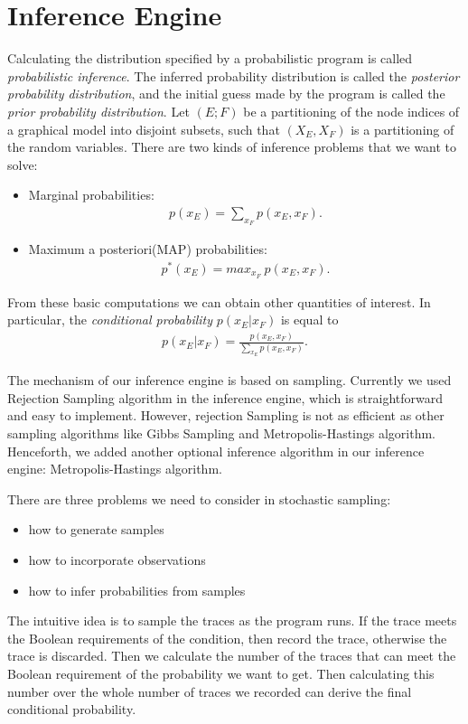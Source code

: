 \section{Inference Engine}
\label{sec:infer}
Calculating the distribution specified by a probabilistic program is called \textit{probabilistic inference}. The inferred probability distribution is called the \textit{posterior probability distribution}, and the initial guess made by the program is called the \textit{prior probability distribution}. Let $(E; F)$ be a partitioning of the node indices of a graphical model into disjoint subsets, such that $(X_E, X_F)$ is a partitioning of the random variables. There are two kinds of inference problems that we want to solve:
\begin{itemize}
  \item Marginal probabilities:
  \begin{align*}
    p(x_E) = \sum_{x_F} p(x_E, x_F).
  \end{align*}
  \item Maximum a posteriori(MAP) probabilities:
  \begin{align*}
    p^*(x_E) = max_{x_F} ~p(x_E, x_F).
  \end{align*}
\end{itemize}
From these basic computations we can obtain other quantities of interest. In particular, the \textit{conditional probability} $p(x_E | x_F)$ is equal to
\begin{align*}
  p(x_E | x_F) = \frac{p(x_E, x_F)}{\sum_{x_E} p(x_E, x_F)}.
\end{align*}

The mechanism of our inference engine is based on sampling. Currently we used Rejection Sampling algorithm in the inference engine, which is straightforward and easy to implement. However, rejection Sampling is not as efficient as other sampling algorithms like Gibbs Sampling and Metropolis-Hastings algorithm. Henceforth, we added another optional inference algorithm in our inference engine: Metropolis-Hastings algorithm. 

There are three problems we need to consider in stochastic sampling:
\begin{itemize}
  \item how to generate samples
  \item how to incorporate observations
  \item how to infer probabilities from samples
\end{itemize}
The intuitive idea is to sample the traces as the program runs. If the trace meets the Boolean requirements of the condition, then record the trace, otherwise the trace is discarded. Then we calculate the number of the traces that can meet the Boolean requirement of the probability we want to get. Then calculating this number over the whole number of traces we recorded can derive the final conditional probability.

